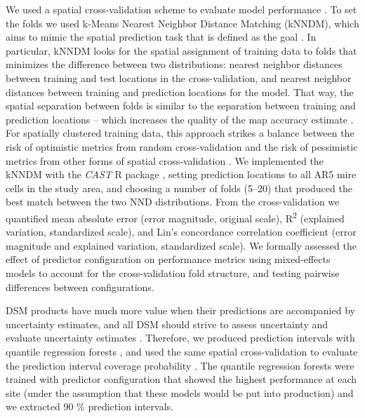 \documentclass[soil, manuscript]{copernicus}
\begin{document}
We used a spatial cross-validation scheme to evaluate model performance \citep{wadouxSpatialCrossvalidationNot2021, meyerMachineLearningbasedGlobal2022}.
To set the folds we used k-Means Nearest Neighbor Distance Matching (kNNDM), which aims to mimic the spatial prediction task that is defined as the goal \citep{linnenbrinkKNNDMCVKfold2024}.
In particular, kNNDM looks for the spatial assignment of training data to folds that minimizes the difference between two distributions: nearest neighbor distances between training and test locations in the cross-validation, and nearest neighbor distances between training and prediction locations for the model.
That way, the spatial separation between folds is similar to the separation between training and prediction locations -- which increases the quality of the map accuracy estimate \citep{linnenbrinkKNNDMCVKfold2024}.
For spatially clustered training data, this approach strikes a balance between the risk of optimistic metrics from random cross-validation and the risk of pessimistic metrics from other forms of spatial cross-validation \citep{wadouxSpatialCrossvalidationNot2021}.
We implemented the kNNDM with the \emph{CAST} R package \citep[v1.0,][]{meyerCASTPackageTraining2024}, setting prediction locations to all AR5 mire cells in the study area, and choosing a number of folds (5--20) that produced the best match between the two NND distributions.
From the cross-validation we quantified mean absolute error (error magnitude, original scale), R\textsuperscript{2} (explained variation, standardized scale), and Lin's concordance correlation coefficient (error magnitude and explained variation, standardized scale).
We formally assessed the effect of predictor configuration on performance metrics using mixed-effects models to account for the cross-validation fold structure, and testing pairwise differences between configurations.

DSM products have much more value when their predictions are accompanied by uncertainty estimates, and all DSM should strive to assess uncertainty \citep{arrouaysImpressionsDigitalSoil2020, wadouxMachineLearningDigital2020} and evaluate uncertainty estimates \citep{heuvelinkSpatialStatisticsSoil2022}.
Therefore, we produced prediction intervals with quantile regression forests \citep{meinshausenQuantileRegressionForests2006}, and used the same spatial cross-validation to evaluate the prediction interval coverage probability \citep{shresthaMachineLearningApproaches2006}.
The quantile regression forests were trained with predictor configuration that showed the highest performance at each site (under the assumption that these models would be put into production) and we extracted 90 \% prediction intervals.
\end{document}

